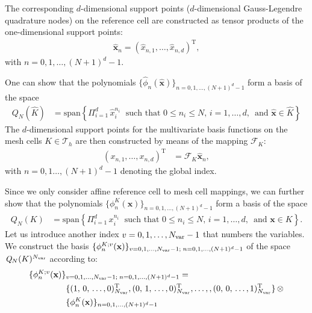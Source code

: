 \documentclass{scrreprt}
\theoremstyle{definition}
\theoremstyle{nonumberplain}
\renewcommand{\vec}[1]{{\textbf{#1}}}
\newcommand{\transp}{^\textrm{T}}
\newcommand{\tria}{\mathcal{T}_h}
\newcommand{\cell}{K}
\newcommand{\refVec}[1]{\hat{\vec{#1}}}
\newcommand{\refCell}{\hat{\cell}}
\newcommand{\mapping}{\boldsymbol{\mathcal{F}}_{\cell}}
\newcommand{\polyspace}[3]{\mathit{#1}_{#2}(#3)}
\begin{document}
The corresponding $d$-dimensional support points ($d$-dimensional
Gauss-Legendre quadrature nodes) on the reference cell are constructed as tensor
products of the one-dimensional support points:
\begin{align*}
\refVec{x}_n = (\hat{x}_{n,1},\ldots,\hat{x}_{n,d})\transp,
\end{align*}
with $n=0,1,\ldots,(N+1)^{d}-1$.

One can show that the polynomials $\{\hat{\phi}_n
(\refVec{x})\}_{n=0,1,\ldots,(N+1)^d-1}$ form a basis of the space
\begin{align*}
\polyspace{Q}{N}{\refCell} &= \text{span}\left\{ \Pi_{i=1}^d\,
\hat{x}_i^{n_i}\; \text{ such that }
0 \leq n_i \leq N,\,i=1,\ldots,d,\, \text{ and } \refVec{x} \in \refCell
\right\}
\end{align*}
The $d$-dimensional support points for the multivariate
basis functions on the mesh cells
$\cell\in\tria$ are then constructed by means of the mapping $\mapping:$ 
\begin{align*}
(x_{n,1},\ldots,x_{n,d})\transp
&=
\mapping\refVec{x}_n,
\end{align*}
with $n=0,1\ldots,(N+1)^d-1$ denoting the global index.

Since we only consider affine reference cell to mesh cell mappings, we can
further show that the polynomials $\{{\phi}^K_n
(\vec{x})\}_{n=0,1,\ldots,(N+1)^d-1}$ form a basis of the space
\begin{align*}
\polyspace{Q}{N}{\cell} &= \text{span}\left\{ \Pi_{i=1}^d\,
x_i^{n_i}\; \text{ such that }
0 \leq n_i \leq N,\,i=1,\ldots,d,\, \text{ and } \vec{x} \in \cell
\right\}.
\end{align*}
Let us introduce another index $v=0,1,\ldots,N_\textup{var}-1$
that numbers the variables.
We construct the basis $\{{\phi}^{K;v}_n
(\vec{x})\}_{v=0,1,\ldots,N_\textup{var}-1;\;n=0,1,\ldots,(N+1)^d-1}$
of the space
$\polyspace{Q}{N}{\cell}^{N_\textup{var}}$ according to:
\begin{align*}
\{{\phi}^{K;v}_n
(\vec{x})\}&_{v=0,1,\ldots,N_\textup{var}-1;\;n=0,1,\ldots,(N+1)^d-1}
= \\
&\lbrace
(
1,\,
0,\,
\ldots,
0
)_{N_\textup{var}}\transp
,
(
0,\,
1,\,
\ldots,
0
)_{N_\textup{var}}\transp
,
\ldots,
,
(
0,\,
0,\,
\ldots,
1
)_{N_\textup{var}}\transp
\rbrace
\,\otimes
\\
&\{{\phi}^K_n
(\vec{x})\}_{n=0,1,\ldots,(N+1)^d-1}
\end{align*}
\end{document}
